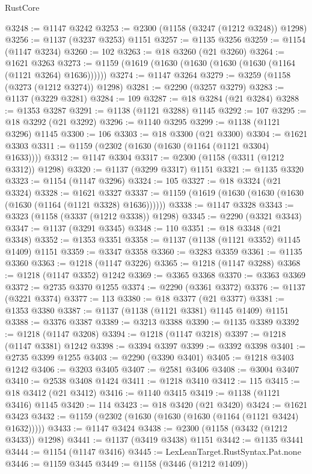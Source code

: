 \begin{lexlean}{RustCore}
\begin{coremodule}
@3248 := @1147 @3242
@3253 := @2300 (@1158 (@3247 (@1212 @3248)) @1298)
@3256 := @1137 (@3237 @3253) @1151
@3257 := @1135 @3256
@3259 := @1154 (@1147 @3234)
@3260 := 102
@3263 := @18 @3260 (@21 @3260)
@3264 := @1621 @3263
@3273 := @1159 (@1619 (@1630 (@1630 (@1630 (@1630 (@1164 (@1121 @3264) @1636))))))
@3274 := @1147 @3264
@3279 := @3259 (@1158 (@3273 (@1212 @3274)) @1298)
@3281 := @2290 (@3257 @3279)
@3283 := @1137 (@3229 @3281)
@3284 := 109
@3287 := @18 @3284 (@21 @3284)
@3288 := @1353 @3287
@3291 := @1138 (@1121 @3288) @1145
@3292 := 107
@3295 := @18 @3292 (@21 @3292)
@3296 := @1140 @3295
@3299 := @1138 (@1121 @3296) @1145
@3300 := 106
@3303 := @18 @3300 (@21 @3300)
@3304 := @1621 @3303
@3311 := @1159 (@2302 (@1630 (@1630 (@1164 (@1121 @3304) @1633))))
@3312 := @1147 @3304
@3317 := @2300 (@1158 (@3311 (@1212 @3312)) @1298)
@3320 := @1137 (@3299 @3317) @1151
@3321 := @1135 @3320
@3323 := @1154 (@1147 @3296)
@3324 := 105
@3327 := @18 @3324 (@21 @3324)
@3328 := @1621 @3327
@3337 := @1159 (@1619 (@1630 (@1630 (@1630 (@1630 (@1164 (@1121 @3328) @1636))))))
@3338 := @1147 @3328
@3343 := @3323 (@1158 (@3337 (@1212 @3338)) @1298)
@3345 := @2290 (@3321 @3343)
@3347 := @1137 (@3291 @3345)
@3348 := 110
@3351 := @18 @3348 (@21 @3348)
@3352 := @1353 @3351
@3358 := @1137 (@1138 (@1121 @3352) @1145 @1409) @1151
@3359 := @3347 @3358
@3360 := @3283 @3359
@3361 := @1135 @3360
@3363 := @1218 (@1147 @3226)
@3365 := @1218 (@1147 @3288)
@3368 := @1218 (@1147 @3352) @1242
@3369 := @3365 @3368
@3370 := @3363 @3369
@3372 := @2735 @3370 @1255
@3374 := @2290 (@3361 @3372)
@3376 := @1137 (@3221 @3374)
@3377 := 113
@3380 := @18 @3377 (@21 @3377)
@3381 := @1353 @3380
@3387 := @1137 (@1138 (@1121 @3381) @1145 @1409) @1151
@3388 := @3376 @3387
@3389 := @3213 @3388
@3390 := @1135 @3389
@3392 := @1218 (@1147 @3208)
@3394 := @1218 (@1147 @3218)
@3397 := @1218 (@1147 @3381) @1242
@3398 := @3394 @3397
@3399 := @3392 @3398
@3401 := @2735 @3399 @1255
@3403 := @2290 (@3390 @3401)
@3405 := @1218 @3403 @1242
@3406 := @3203 @3405
@3407 := @2581 @3406
@3408 := @3004 @3407
@3410 := @2538 @3408 @1424
@3411 := @1218 @3410
@3412 := 115
@3415 := @18 @3412 (@21 @3412)
@3416 := @1140 @3415
@3419 := @1138 (@1121 @3416) @1145
@3420 := 114
@3423 := @18 @3420 (@21 @3420)
@3424 := @1621 @3423
@3432 := @1159 (@2302 (@1630 (@1630 (@1630 (@1164 (@1121 @3424) @1632)))))
@3433 := @1147 @3424
@3438 := @2300 (@1158 (@3432 (@1212 @3433)) @1298)
@3441 := @1137 (@3419 @3438) @1151
@3442 := @1135 @3441
@3444 := @1154 (@1147 @3416)
@3445 := LexLeanTarget.RustSyntax.Pat.none
@3446 := @1159 @3445
@3449 := @1158 (@3446 (@1212 @1409))

\end{coremodule}
\end{lexlean}

